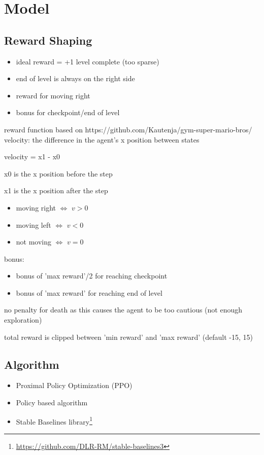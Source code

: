 \documentclass{article}
\begin{document}
    \section{Model}
    \subsection{Reward Shaping}
    \begin{itemize}
        \item ideal reward = +1 level complete (too sparse)
        \item end of level is always on the right side
        \item reward for moving right
        \item bonus for checkpoint/end of level
    \end{itemize}
    reward function based on https://github.com/Kautenja/gym-super-mario-bros/
    velocity: the difference in the agent's x position between states

    velocity = x1 - x0

    x0 is the x position before the step

    x1 is the x position after the step

    \begin{itemize}
        \item moving right $\Leftrightarrow$ $v > 0$
        \item moving left $\Leftrightarrow$ $v < 0$
        \item not moving $\Leftrightarrow$ $v = 0$
    \end{itemize}

    bonus:
    \begin{itemize}
        \item bonus of 'max reward'/2 for reaching checkpoint
        \item bonus of 'max reward' for reaching end of level
    \end{itemize}
    no penalty for death as this causes the agent to be too cautious (not enough exploration)

    total reward is clipped between 'min reward' and 'max reward' (default -15, 15)

    \subsection{Algorithm}
    \begin{itemize}
        \item Proximal Policy Optimization (PPO)
        \item Policy based algorithm
        \item Stable Baselines library\footnote{\url{https://github.com/DLR-RM/stable-baselines3}}
    \end{itemize}
\end{document}
